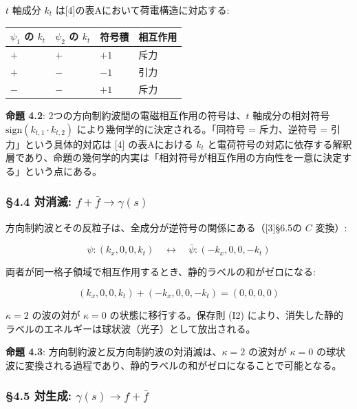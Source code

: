 \documentclass[
  a4paper,11pt]{ltjsarticle}
\newcounter{none}
\theoremstyle{definition}
\theoremstyle{remark}
\begin{document}
\(t\) 軸成分 \(k_t\) は{[}4{]}の表Aにおいて荷電構造に対応する:

{\def\LTcaptype{none} %
\begin{longtable}[]{@{}llll@{}}
\toprule\noalign{}
\(\psi_1\) の \(k_t\) & \(\psi_2\) の \(k_t\) & 符号積 & 相互作用 \\
\midrule\noalign{}
\endhead
\bottomrule\noalign{}
\endlastfoot
\(+\) & \(+\) & \(+1\) & 斥力 \\
\(+\) & \(-\) & \(-1\) & 引力 \\
\(-\) & \(-\) & \(+1\) & 斥力 \\
\end{longtable}
}

\textbf{命題 4.2}: 2つの方向制約波間の電磁相互作用の符号は、\(t\)
軸成分の相対符号 \(\mathrm{sign}(k_{t,1} \cdot k_{t,2})\)
により幾何学的に決定される。「同符号 = 斥力、逆符号 =
引力」という具体的対応は {[}4{]} の表Aにおける \(k_t\)
と電荷符号の対応に依存する解釈層であり、命題の幾何学的内実は「相対符号が相互作用の方向性を一意に決定する」という点にある。

\subsubsection{\texorpdfstring{§4.4 対消滅:
\(f + \bar{f} \to \gamma(s)\)}{§4.4 対消滅: f + \textbackslash bar\{f\} \textbackslash to \textbackslash gamma(s)}}\label{ux5bfeux6d88ux6ec5-f-barf-to-gammas}

方向制約波とその反粒子は、全成分が逆符号の関係にある（{[}3{]}§6.5の
\(C\) 変換）:

\[\psi: (k_x, 0, 0, k_t) \quad \longleftrightarrow \quad \bar{\psi}: (-k_x, 0, 0, -k_t)\]

両者が同一格子領域で相互作用するとき、静的ラベルの和がゼロになる:

\[(k_x, 0, 0, k_t) + (-k_x, 0, 0, -k_t) = (0, 0, 0, 0)\]

\(\kappa = 2\) の波の対が \(\kappa = 0\) の状態に移行する。保存則 (I2)
により、消失した静的ラベルのエネルギーは球状波（光子）として放出される。

\textbf{命題 4.3}: 方向制約波と反方向制約波の対消滅は、\(\kappa = 2\)
の波対が \(\kappa = 0\)
の球状波に変換される過程であり、静的ラベルの和がゼロになることで可能となる。

\subsubsection{\texorpdfstring{§4.5 対生成:
\(\gamma(s) \to f + \bar{f}\)}{§4.5 対生成: \textbackslash gamma(s) \textbackslash to f + \textbackslash bar\{f\}}}\label{ux5bfeux751fux6210-gammas-to-f-barf}
\end{document}
